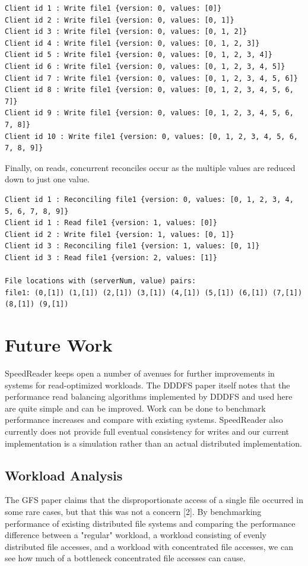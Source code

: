 \documentclass[twoside]{article}
\begin{document}
\begin{multicols}{2}
\begin{lstlisting}
Client id 1 : Write file1 {version: 0, values: [0]}
Client id 2 : Write file1 {version: 0, values: [0, 1]}
Client id 3 : Write file1 {version: 0, values: [0, 1, 2]}
Client id 4 : Write file1 {version: 0, values: [0, 1, 2, 3]}
Client id 5 : Write file1 {version: 0, values: [0, 1, 2, 3, 4]}
Client id 6 : Write file1 {version: 0, values: [0, 1, 2, 3, 4, 5]}
Client id 7 : Write file1 {version: 0, values: [0, 1, 2, 3, 4, 5, 6]}
Client id 8 : Write file1 {version: 0, values: [0, 1, 2, 3, 4, 5, 6, 7]}
Client id 9 : Write file1 {version: 0, values: [0, 1, 2, 3, 4, 5, 6, 7, 8]}
Client id 10 : Write file1 {version: 0, values: [0, 1, 2, 3, 4, 5, 6, 7, 8, 9]}
\end{lstlisting}

Finally, on reads, concurrent reconciles occur as the multiple values are reduced down to just one value.
\begin{lstlisting}
Client id 1 : Reconciling file1 {version: 0, values: [0, 1, 2, 3, 4, 5, 6, 7, 8, 9]}
Client id 1 : Read file1 {version: 1, values: [0]}
Client id 2 : Write file1 {version: 1, values: [0, 1]}
Client id 3 : Reconciling file1 {version: 1, values: [0, 1]}
Client id 3 : Read file1 {version: 2, values: [1]}

File locations with (serverNum, value) pairs:
file1: (0,[1]) (1,[1]) (2,[1]) (3,[1]) (4,[1]) (5,[1]) (6,[1]) (7,[1]) (8,[1]) (9,[1])
\end{lstlisting}
\section{Future Work}
SpeedReader keeps open a number of avenues for further improvements in systems for read-optimized workloads. The DDDFS paper itself notes that the performance read balancing algorithms implemented by DDDFS and used here are quite simple and can be improved.  Work can be done to benchmark performance increases and compare with existing systems. SpeedReader also currently does not provide full eventual consistency for writes and our current implementation is a simulation rather than an actual distributed implementation.

\subsection*{Workload Analysis}
The GFS paper claims that the disproportionate access of a single file occurred in some rare cases, but that this was not a concern [2]. By benchmarking performance of existing distributed file systems and comparing the performance difference between a "regular" workload, a workload consisting of evenly distributed file accesses, and a workload with concentrated file accesses, we can see how much of a bottleneck concentrated file accesses can cause.


\end{multicols}
\end{document}
